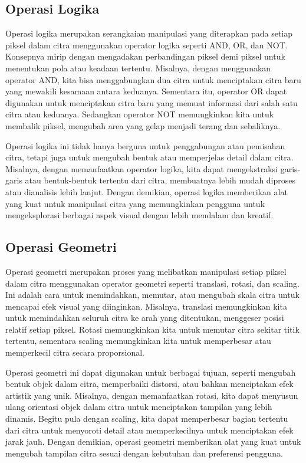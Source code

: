 \documentclass[a4paper,12pt,openany]{book}
\begin{document}
\subsection{Operasi Logika}

Operasi logika merupakan serangkaian manipulasi yang diterapkan pada setiap piksel dalam citra menggunakan operator logika seperti AND, OR, dan NOT. Konsepnya mirip dengan mengadakan perbandingan piksel demi piksel untuk menentukan pola atau keadaan tertentu. Misalnya, dengan menggunakan operator AND, kita bisa menggabungkan dua citra untuk menciptakan citra baru yang mewakili kesamaan antara keduanya. Sementara itu, operator OR dapat digunakan untuk menciptakan citra baru yang memuat informasi dari salah satu citra atau keduanya. Sedangkan operator NOT memungkinkan kita untuk membalik piksel, mengubah area yang gelap menjadi terang dan sebaliknya.

Operasi logika ini tidak hanya berguna untuk penggabungan atau pemisahan citra, tetapi juga untuk mengubah bentuk atau memperjelas detail dalam citra. Misalnya, dengan memanfaatkan operator logika, kita dapat mengekstraksi garis-garis atau bentuk-bentuk tertentu dari citra, membuatnya lebih mudah diproses atau dianalisis lebih lanjut. Dengan demikian, operasi logika memberikan alat yang kuat untuk manipulasi citra yang memungkinkan pengguna untuk mengeksplorasi berbagai aspek visual dengan lebih mendalam dan kreatif.

\subsection{Operasi Geometri}

Operasi geometri merupakan proses yang melibatkan manipulasi setiap piksel dalam citra menggunakan operator geometri seperti translasi, rotasi, dan scaling. Ini adalah cara untuk memindahkan, memutar, atau mengubah skala citra untuk mencapai efek visual yang diinginkan. Misalnya, translasi memungkinkan kita untuk memindahkan seluruh citra ke arah yang ditentukan, menggeser posisi relatif setiap piksel. Rotasi memungkinkan kita untuk memutar citra sekitar titik tertentu, sementara scaling memungkinkan kita untuk memperbesar atau memperkecil citra secara proporsional.

Operasi geometri ini dapat digunakan untuk berbagai tujuan, seperti mengubah bentuk objek dalam citra, memperbaiki distorsi, atau bahkan menciptakan efek artistik yang unik. Misalnya, dengan memanfaatkan rotasi, kita dapat menyusun ulang orientasi objek dalam citra untuk menciptakan tampilan yang lebih dinamis. Begitu pula dengan scaling, kita dapat memperbesar bagian tertentu dari citra untuk menyoroti detail atau memperkecilnya untuk menciptakan efek jarak jauh. Dengan demikian, operasi geometri memberikan alat yang kuat untuk mengubah tampilan citra sesuai dengan kebutuhan dan preferensi pengguna.
\end{document}
